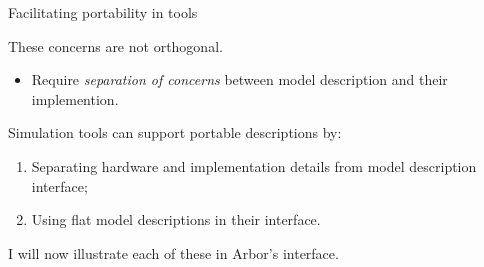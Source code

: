 \documentclass[aspectratio=43]{beamer}
\newcommand{\arbor}{{\ttfamily Arbor}\xspace}
\begin{document}
\begin{frame}[fragile]{Facilitating portability in tools}

These concerns are not orthogonal.
\begin{itemize}
    \item Require \emph{separation of concerns} between model description and their implemention.
\end{itemize}

\vspace{10pt}


Simulation tools can support portable descriptions by:
\begin{enumerate}
    \item Separating hardware and implementation details from model description interface;
    \item Using flat model descriptions in their interface.
\end{enumerate}

\vspace{10pt}

I will now illustrate each of these in \arbor's interface.

\end{frame}

\end{document}
